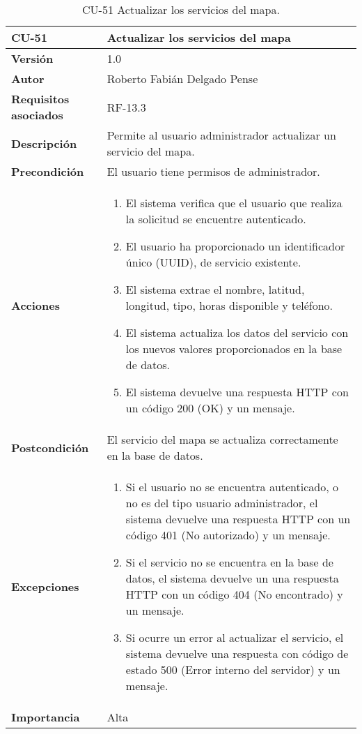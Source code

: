 \begin{table}[p]
	\centering
	\begin{tabularx}{\linewidth}{ p{} p{} }
		\toprule
		\textbf{CU-51}    & \textbf{Actualizar los servicios del mapa}\\
		\toprule
		\textbf{Versión}              & 1.0    \\
		\textbf{Autor}                & Roberto Fabián Delgado Pense \\
		\textbf{Requisitos asociados} & RF-13.3 \\ 
		\textbf{Descripción}          & Permite al usuario administrador actualizar un servicio del mapa. \\
		\textbf{Precondición}         & El usuario tiene permisos de administrador. \\
		\textbf{Acciones}             &
		\begin{enumerate}
			\def\labelenumi{\arabic{enumi}.}
			\tightlist
                \item El sistema verifica que el usuario que realiza la solicitud se encuentre autenticado.
			\item El usuario ha proporcionado un identificador único (UUID), de servicio existente.
                \item El sistema extrae el nombre, latitud, longitud, tipo, horas disponible y teléfono.
                \item El sistema actualiza los datos del servicio con los nuevos valores proporcionados en la base de datos.
                \item El sistema devuelve una respuesta HTTP con un código 200 (OK) y un mensaje.
            \end{enumerate}\\
		\textbf{Postcondición}        & El servicio del mapa se actualiza correctamente en la base de datos.\\
		\textbf{Excepciones}          & 
            \begin{enumerate}
			\def\labelenumi{\arabic{enumi}.}
			\tightlist
   			\item Si el usuario no se encuentra autenticado, o no es del tipo usuario administrador, el sistema devuelve una                 respuesta HTTP con un código 401 (No autorizado) y un mensaje.
                \item   Si el servicio no se encuentra en la base de datos, el sistema devuelve un                           una respuesta HTTP con un código 404 (No encontrado) y un mensaje. 
                \item Si ocurre un error al actualizar el servicio, el sistema devuelve una respuesta con código de estado 500 (Error interno del servidor) y un mensaje.
            \end{enumerate}\\
		\textbf{Importancia}          & Alta \\
		\bottomrule
	\end{tabularx}
	\caption{CU-51 Actualizar los servicios del mapa.}
\end{table}

